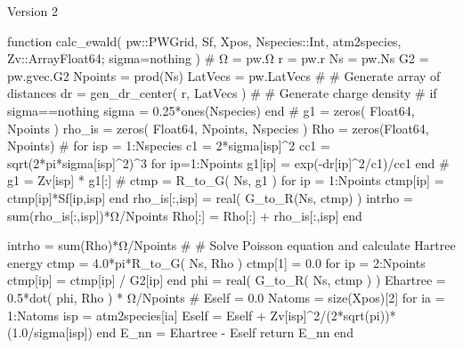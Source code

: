 Version 2

\begin{juliacode}
function calc_ewald( pw::PWGrid, Sf, Xpos, Nspecies::Int, atm2species,
                     Zv::Array{Float64}; sigma=nothing )
  #
  Ω  = pw.Ω
  r  = pw.r
  Ns = pw.Ns
  G2 = pw.gvec.G2
  Npoints = prod(Ns)
  LatVecs = pw.LatVecs
  #
  # Generate array of distances
  dr = gen_dr_center( r, LatVecs )
  #
  # Generate charge density
  #
  if sigma==nothing
    sigma = 0.25*ones(Nspecies)
  end
  #
  g1  = zeros( Float64, Npoints )
  rho_is = zeros( Float64, Npoints, Nspecies )
  Rho = zeros(Float64, Npoints)
  #
  for isp = 1:Nspecies
    c1 = 2*sigma[isp]^2
    cc1 = sqrt(2*pi*sigma[isp]^2)^3
    for ip=1:Npoints
      g1[ip] = exp(-dr[ip]^2/c1)/cc1
    end
    #
    g1 = Zv[isp] * g1[:]
    #
    ctmp = R_to_G( Ns, g1 )
    for ip = 1:Npoints
      ctmp[ip] = ctmp[ip]*Sf[ip,isp]
    end
    rho_is[:,isp] = real( G_to_R(Ns, ctmp) )
    intrho = sum(rho_is[:,isp])*Ω/Npoints
    Rho[:] = Rho[:] + rho_is[:,isp]
  end

  intrho = sum(Rho)*Ω/Npoints
  #
  # Solve Poisson equation and calculate Hartree energy
  ctmp = 4.0*pi*R_to_G( Ns, Rho )
  ctmp[1] = 0.0
  for ip = 2:Npoints
    ctmp[ip] = ctmp[ip] / G2[ip]
  end
  phi = real( G_to_R( Ns, ctmp ) )
  Ehartree = 0.5*dot( phi, Rho ) * Ω/Npoints
  #
  Eself = 0.0
  Natoms = size(Xpos)[2]
  for ia = 1:Natoms
    isp = atm2species[ia]
    Eself = Eself + Zv[isp]^2/(2*sqrt(pi))*(1.0/sigma[isp])
  end
  E_nn = Ehartree - Eself
  return E_nn
end
\end{juliacode}
